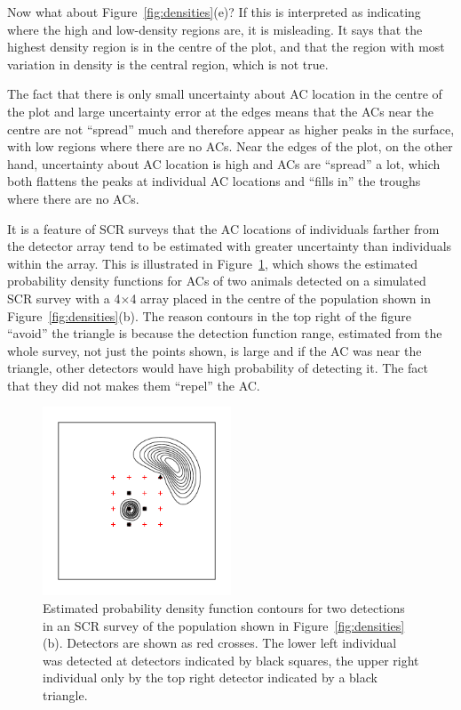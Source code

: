 \documentclass[useAMS,usenatbib,referee]{biom}
\begin{document}
Now what about Figure~\ref{fig:densities}(e)? If this is interpreted as indicating where the high and low-density regions are, it is misleading. It says that the highest density region is in the centre of the plot, and that the region with most variation in density is the central region, which is not true. 

The fact that there is only small uncertainty about AC location in the centre of the plot and large uncertainty error at the edges means that the ACs near the centre are not ``spread'' much and therefore appear as higher peaks in the surface, with low regions where there are no ACs. Near the edges of the plot, on the other hand, uncertainty about AC location is high and ACs are ``spread'' a lot, which both flattens the peaks at individual AC locations and ``fills in'' the troughs where there are no ACs. 

It is a feature of SCR surveys that the AC locations of individuals farther from the detector array tend to be estimated with greater uncertainty than individuals within the array. This is illustrated in Figure~\ref{fig:screrr}, which shows the estimated probability density functions for ACs of two animals detected on a simulated SCR survey with a 4$\times$4 array placed in the centre of the population shown in Figure~\ref{fig:densities}(b). The reason contours in the top right of the figure ``avoid'' the triangle is because the detection function range, estimated from the whole survey, not just the points shown, is large and if the AC was near the triangle, other detectors would have high probability of detecting it. The fact that they did not makes them ``repel'' the AC. 

\begin{figure}[htbp]
\centering
\includegraphics[width=0.5\textwidth]{screrr.pdf}
\caption{Estimated probability density function contours for two detections in an SCR survey of the population shown in Figure~\ref{fig:densities}(b). Detectors are shown as red crosses. The lower left individual was detected at detectors indicated by black squares, the upper right individual only by the top right detector indicated by a black triangle.}
\label{fig:screrr}
\end{figure}
\end{document}
